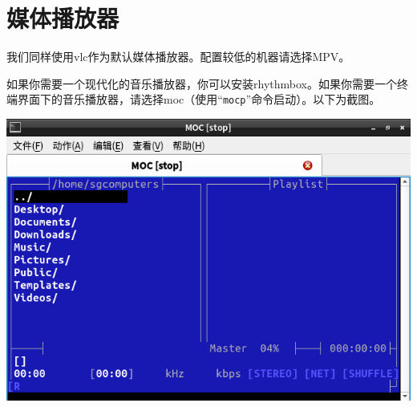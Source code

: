 \chapter{媒体播放器}
我们同样使用vlc作为默认媒体播放器。配置较低的机器请选择MPV。\par
如果你需要一个现代化的音乐播放器，你可以安装rhythmbox。如果你需要一个终端界面下的音乐播放器，请选择moc（使用“\verb|mocp|”命令启动）。以下为截图。
\begin{center}
	\includegraphics[width=0.7\linewidth]{pic/moc}
\end{center}
